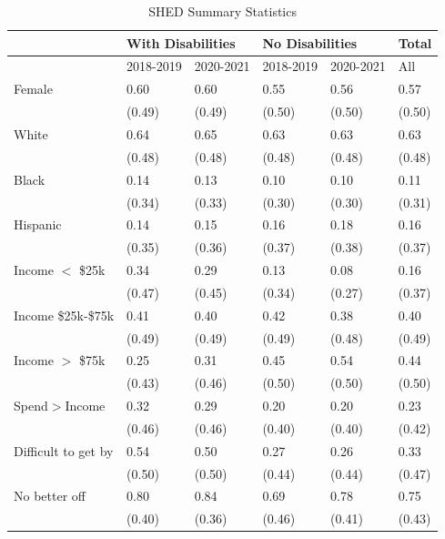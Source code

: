 \documentclass[12pt]{article}
\begin{document}
\begin{table}[!ht]
    \centering
    \caption{SHED Summary Statistics}
    \begin{tabular}{llllll}
    \hline\hline
     &\multicolumn{2}{l|}{With Disabilities}&\multicolumn{2}{l|}{No Disabilities}&       Total\\ \hline
        ~ & 2018-2019 & 2020-2021 & 2018-2019 & 2020-2021 & All \\ \hline
        Female & 0.60  & 0.60  & 0.55  & 0.56  & 0.57  \\ 
        ~ & (0.49) & (0.49) & (0.50) & (0.50) & (0.50) \\ 
        White & 0.64  & 0.65  & 0.63  & 0.63  & 0.63  \\ 
        ~ & (0.48) & (0.48) & (0.48) & (0.48) & (0.48) \\ 
        Black & 0.14  & 0.13  & 0.10  & 0.10  & 0.11  \\ 
        ~ & (0.34) & (0.33) & (0.30) & (0.30) & (0.31) \\ 
        Hispanic & 0.14  & 0.15  & 0.16  & 0.18  & 0.16  \\ 
        ~ & (0.35) & (0.36) & (0.37) & (0.38) & (0.37) \\ 
        Income $<$ \$25k & 0.34  & 0.29  & 0.13  & 0.08  & 0.16  \\ 
        ~ & (0.47) & (0.45) & (0.34) & (0.27) & (0.37) \\ 
        Income \$25k-\$75k & 0.41  & 0.40  & 0.42  & 0.38  & 0.40  \\ 
        ~ & (0.49) & (0.49) & (0.49) & (0.48) & (0.49) \\ 
        Income $>$ \$75k & 0.25  & 0.31  & 0.45  & 0.54  & 0.44  \\ 
        ~ & (0.43) & (0.46) & (0.50) & (0.50) & (0.50) \\ 
        Spend$>$Income & 0.32  & 0.29  & 0.20  & 0.20  & 0.23  \\ 
        ~ & (0.46) & (0.46) & (0.40) & (0.40) & (0.42) \\ 
        Difficult to get by & 0.54  & 0.50  & 0.27  & 0.26  & 0.33  \\ 
        ~ & (0.50) & (0.50) & (0.44) & (0.44) & (0.47) \\ 
        No better off & 0.80  & 0.84  & 0.69  & 0.78  & 0.75  \\ 
        ~ & (0.40) & (0.36) & (0.46) & (0.41) & (0.43) \\ 

\end{tabular}
\end{table}
\end{document}
